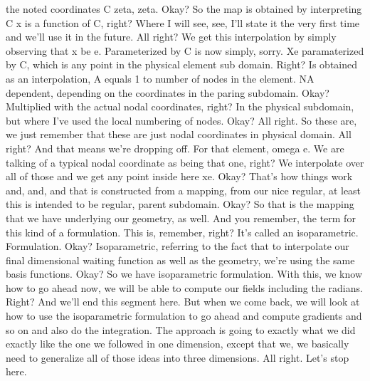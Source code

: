 \documentclass[10pt]{article}
\begin{document}
the noted coordinates C zeta, zeta. Okay? So the map is obtained by interpreting C x is a function of C, right? Where I will see, see, I'll state it the very first time and we'll use it in the future. All right? We get this interpolation by simply observing that x be e. Parameterized by C is now simply, sorry. Xe paramaterized by C, which is any point in the physical element sub domain. Right? Is obtained as an interpolation, A equals 1 to number of nodes in the element. NA dependent, depending on the coordinates in the paring subdomain. Okay? Multiplied with the actual nodal coordinates, right? In the physical subdomain, but where I've used the local numbering of nodes. Okay? All right. So these are, we just remember that these are just nodal coordinates in physical domain. All right? And that means we're dropping off. For that element, omega e. We are talking of a typical nodal coordinate as being that one, right? We interpolate over all of those and we get any point inside here xe. Okay? That's how things work and, and, and that is constructed from a mapping, from our nice regular, at least this is intended to be regular, parent subdomain. Okay? So that is the mapping that we have underlying our geometry, as well. And you remember, the term for this kind of a formulation. This is, remember, right? It's called an isoparametric. Formulation. Okay? Isoparametric, referring to the fact that to interpolate our final dimensional waiting function as well as the geometry, we're using the same basis functions. Okay? So we have isoparametric formulation. With this, we know how to go ahead now, we will be able to compute our fields including the radians. Right? And we'll end this segment here. But when we come back, we will look at how to use the isoparametric formulation to go ahead and compute gradients and so on and also do the integration. The approach is going to exactly what we did exactly like the one we followed in one dimension, except that we, we basically need to generalize all of those ideas into three dimensions. All right. Let's stop here.
\end{document}

